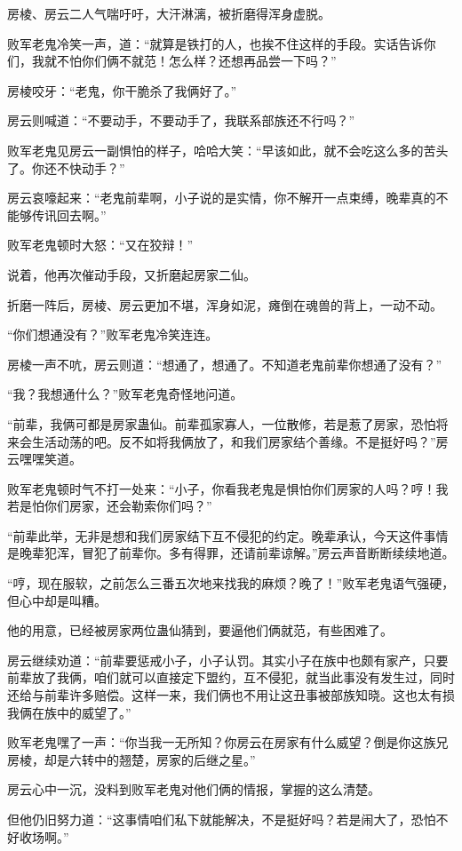 \begin{this_body}
房棱、房云二人气喘吁吁，大汗淋漓，被折磨得浑身虚脱。

败军老鬼冷笑一声，道：“就算是铁打的人，也挨不住这样的手段。实话告诉你们，我就不怕你们俩不就范！怎么样？还想再品尝一下吗？”

房棱咬牙：“老鬼，你干脆杀了我俩好了。”

房云则喊道：“不要动手，不要动手了，我联系部族还不行吗？”

败军老鬼见房云一副惧怕的样子，哈哈大笑：“早该如此，就不会吃这么多的苦头了。你还不快动手？”

房云哀嚎起来：“老鬼前辈啊，小子说的是实情，你不解开一点束缚，晚辈真的不能够传讯回去啊。”

败军老鬼顿时大怒：“又在狡辩！”

说着，他再次催动手段，又折磨起房家二仙。

折磨一阵后，房棱、房云更加不堪，浑身如泥，瘫倒在魂兽的背上，一动不动。

“你们想通没有？”败军老鬼冷笑连连。

房棱一声不吭，房云则道：“想通了，想通了。不知道老鬼前辈你想通了没有？”

“我？我想通什么？”败军老鬼奇怪地问道。

“前辈，我俩可都是房家蛊仙。前辈孤家寡人，一位散修，若是惹了房家，恐怕将来会生活动荡的吧。反不如将我俩放了，和我们房家结个善缘。不是挺好吗？”房云嘿嘿笑道。

败军老鬼顿时气不打一处来：“小子，你看我老鬼是惧怕你们房家的人吗？哼！我若是怕你们房家，还会勒索你们吗？”

“前辈此举，无非是想和我们房家结下互不侵犯的约定。晚辈承认，今天这件事情是晚辈犯浑，冒犯了前辈你。多有得罪，还请前辈谅解。”房云声音断断续续地道。

“哼，现在服软，之前怎么三番五次地来找我的麻烦？晚了！”败军老鬼语气强硬，但心中却是叫糟。

他的用意，已经被房家两位蛊仙猜到，要逼他们俩就范，有些困难了。

房云继续劝道：“前辈要惩戒小子，小子认罚。其实小子在族中也颇有家产，只要前辈放了我俩，咱们就可以直接定下盟约，互不侵犯，就当此事没有发生过，同时还给与前辈许多赔偿。这样一来，我们俩也不用让这丑事被部族知晓。这也太有损我俩在族中的威望了。”

败军老鬼嘿了一声：“你当我一无所知？你房云在房家有什么威望？倒是你这族兄房棱，却是六转中的翘楚，房家的后继之星。”

房云心中一沉，没料到败军老鬼对他们俩的情报，掌握的这么清楚。

但他仍旧努力道：“这事情咱们私下就能解决，不是挺好吗？若是闹大了，恐怕不好收场啊。”


\end{this_body}
